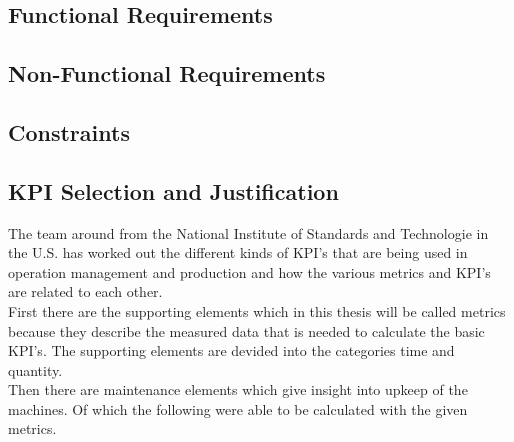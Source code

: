 \subsection{Functional Requirements} %
\subsection{Non-Functional Requirements} %
\subsection{Constraints} %
\subsection{KPI Selection and Justification}
The team around \cite{kangHierarchicalStructureKey2016} from the National Institute of Standards and Technologie in the U.S. has worked out the different kinds of KPI's that are being used in operation management and production and how the various metrics and KPI's are related to each other.
\\First there are the supporting elements which in this thesis will be called metrics because they describe the measured data that is needed to calculate the basic KPI's. The supporting elements are devided into the categories time and quantity.
\\Then there are maintenance elements which give insight into upkeep of the machines. Of which the following were able to be calculated with the given metrics.
\\